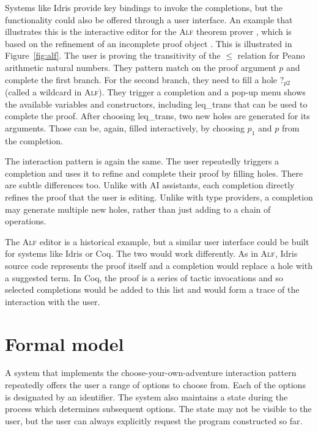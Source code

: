 \documentclass[a4paper,UKenglish,cleveref, autoref, thm-restate]{lipics-v2021}
\newcommand{\ident}[1]{\textsf{#1}}
\begin{document}
Systems like Idris provide key bindings to invoke the completions, but the functionality could
also be offered through a user interface. An example that illustrates this is the interactive editor
for the \textsc{Alf} theorem prover \cite{magnusson-1994-alf}, which is based on the refinement of
an incomplete proof object \cite{altenkirch-1994-alf}. This is illustrated in Figure~\ref{fig:alf}.
The user is proving the transitivity of the $\leq$ relation for Peano arithmetic natural numbers.
They pattern match on the proof argument $p$ and complete the first branch. For the second branch,
they need to fill a hole $?_{p2}$ (called a wildcard in \textsc{Alf}). They trigger a completion
and a pop-up menu shows the available variables and constructors, including \ident{leq\_trans} that
can be used to complete the proof. After choosing \ident{leq\_trans}, two new holes are generated
for its arguments. Those can be, again, filled interactively, by choosing $p_1$ and $p$ from the
completion.

The interaction pattern is again the same. The user repeatedly triggers a completion and uses
it to refine and complete their proof by filling holes. There are subtle differences too. Unlike
with AI assistants, each completion directly refines the proof that the user is editing. Unlike
with type providers, a completion may generate multiple new holes, rather than just adding to a
chain of operations.

The \textsc{Alf} editor is a historical example, but a similar user interface could be built for
systems like Idris or Coq. The two would work differently. As in \textsc{Alf}, Idris source code
represents the proof itself and a completion would replace a hole with a suggested term. In Coq,
the proof is a series of tactic invocations and so selected completions would be added to this
list and would form a trace of the interaction with the user.

\newpage

\section{Formal model}
\label{sec:calculus}

A system that implements the choose-your-own-adventure interaction pattern repeatedly offers
the user a range of options to choose from. Each of the options is designated by an identifier.
The system also maintains a state during the process which determines subsequent options. The state
may not be visible to the user, but the user can always explicitly request the program constructed
so far.
\end{document}
